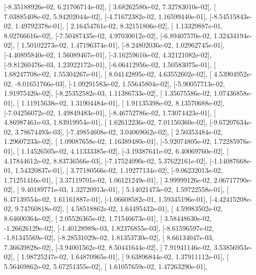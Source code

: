 \documentclass{article}
\begin{document}
       [-8.35188926e-02,  6.21706714e-02],
       [ 3.68262580e-02,  7.32783010e-02],
       [ 7.03885408e-02,  5.94202044e-02],
       [-4.71672382e-02,  1.16599440e-01],
       [-8.54515843e-02,  1.49792378e-01],
       [ 2.16454761e-02,  8.32151806e-02],
       [ 1.13329887e-01,  8.02766616e-02],
       [-7.50487435e-02,  4.97030012e-02],
       [-6.89407570e-02,  1.32434194e-02],
       [ 1.50102273e-02,  1.47196374e-01],
       [-8.24802036e-02,  1.02962745e-01],
       [-4.40895840e-02,  1.56089467e-01],
       [-3.16259610e-02,  4.32121082e-02],
       [-9.81260476e-03,  1.23922172e-01],
       [-6.06412956e-02,  1.50583075e-01],
       [ 1.68247708e-02,  1.55304267e-01],
       [ 8.04142895e-02,  4.63552602e-02],
       [ 4.53904952e-02, -8.01651766e-03],
       [-1.09291583e-02,  1.55645804e-02],
       [-5.90057713e-02,  1.91975420e-02],
       [-8.25352582e-03,  1.11386733e-02],
       [ 1.35675586e-02,  1.07436858e-01],
       [ 1.11915638e-02,  1.31904484e-01],
       [ 1.91135398e-02,  8.13570688e-02],
       [-7.04256072e-02,  1.49849483e-01],
       [-8.46752786e-02,  1.73074423e-01],
       [ 4.86987461e-03,  1.83919954e-01],
       [ 1.62612236e-02,  7.01150360e-02],
       [-9.67207634e-02,  3.78674493e-03],
       [-7.49854608e-02,  3.04069662e-02],
       [ 2.50353484e-02,  1.29607233e-02],
       [ 1.09087658e-02,  1.16389480e-01],
       [-5.92074805e-02,  1.72285976e-01],
       [ 1.14526505e-02,  4.11333385e-02],
       [-3.19387641e-02,  6.40069760e-02],
       [ 4.17844612e-02,  8.83736566e-03],
       [-7.17524090e-02,  5.37622161e-02],
       [-1.14087668e-01,  1.54320837e-01],
       [ 3.77180566e-02,  1.19277134e-02],
       [-9.06232013e-02,  1.71251416e-01],
       [ 3.37119701e-02,  1.06121249e-01],
       [ 3.99999126e-02,  2.06717790e-02],
       [ 9.40189771e-03,  1.32720913e-01],
       [ 5.14021473e-02,  1.59722558e-01],
       [ 6.47139554e-02,  1.61161887e-01],
       [-1.06608582e-01,  1.59345196e-01],
       [-4.42415208e-02,  9.74760818e-02],
       [ 4.58518862e-02,  1.64495432e-01],
       [ 4.59983502e-02,  8.64600364e-02],
       [ 2.05526365e-02,  1.71546673e-01],
       [ 3.58448630e-02, -1.26626129e-02],
       [-1.40128989e-03,  1.82376855e-03],
       [-8.61596597e-02, -1.81345569e-02],
       [-8.28531029e-02,  1.81353730e-02],
       [ 8.66134047e-03,  7.36639828e-02],
       [-3.94001562e-02,  8.50441644e-02],
       [ 7.91941146e-02,  3.53856953e-02],
       [ 1.98725247e-02,  1.64870965e-01],
       [ 9.63896844e-02,  1.37911112e-01],
       [ 5.56469862e-02,  5.67251355e-02],
       [ 1.61057659e-02,  1.47263290e-01],
\end{document}
